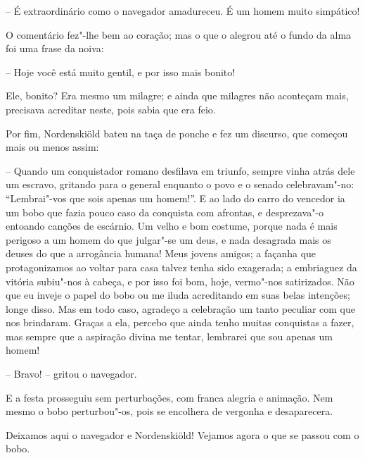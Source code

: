 -- É extraordinário como o navegador amadureceu. É um homem muito
simpático!

O comentário fez"-lhe bem ao coração; mas o que o alegrou até o fundo
da alma foi uma frase da noiva:

-- Hoje você está muito gentil, e por isso mais bonito!

Ele, bonito? Era mesmo um milagre; e ainda que milagres não aconteçam
mais, precisava acreditar neste, pois sabia que era feio.

Por fim, Nordenskiöld  bateu na taça de ponche e fez um discurso, que
começou mais ou menos assim:

-- Quando um conquistador romano desfilava em triunfo, sempre vinha atrás
dele um escravo, gritando para o general enquanto o povo e o senado
celebravam"-no: ``Lembrai"-vos que sois apenas um homem!''. E ao lado
do carro do vencedor ia um bobo que fazia pouco caso da conquista com
afrontas, e desprezava"-o entoando canções de escárnio. Um velho e bom
costume, porque nada é mais perigoso a um homem do que julgar"-se um
deus, e nada desagrada mais os deuses do que a arrogância humana!  Meus
jovens amigos; a façanha que protagonizamos ao voltar para casa talvez
tenha sido exagerada; a embriaguez da vitória subiu"-nos à cabeça, e
por isso foi bom, hoje, vermo"-nos satirizados. Não que eu inveje o
papel do bobo ou me iluda acreditando em suas belas intenções; longe
disso. Mas em todo caso, agradeço a celebração um tanto peculiar com
que nos brindaram. Graças a ela, percebo que ainda tenho muitas
conquistas a fazer, mas sempre que a aspiração divina me tentar,
lembrarei que sou apenas um homem!

-- Bravo! -- gritou o navegador.

E a festa prosseguiu sem perturbações, com franca  alegria e animação.
Nem mesmo o bobo perturbou"-os, pois se encolhera de vergonha e
desaparecera. 

 Deixamos aqui o navegador e Nordenskiöld! Vejamos agora o que se passou
com o bobo.

